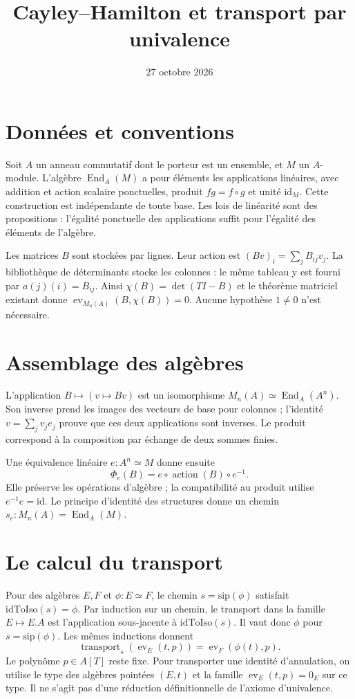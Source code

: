 \documentclass[11pt]{article}
\title{Cayley--Hamilton et transport par univalence}
\author{}
\date{27 octobre 2026}
\newcommand{\End}{\operatorname{End}}
\newcommand{\ev}{\operatorname{ev}}
\begin{document}
\maketitle

\section{Données et conventions}
Soit $A$ un anneau commutatif dont le porteur est un ensemble, et $M$
un $A$-module. L'algèbre $\End_A(M)$ a pour éléments les applications
linéaires, avec addition et action scalaire ponctuelles, produit
$fg=f\circ g$ et unité $\mathrm{id}_M$. Cette construction est indépendante
de toute base. Les lois de linéarité sont des propositions : l'égalité
ponctuelle des applications suffit pour l'égalité des éléments de l'algèbre.

Les matrices $B$ sont stockées par lignes. Leur action est
$(Bv)_i=\sum_j B_{ij}v_j$. La bibliothèque de déterminants stocke les
colonnes : le même tableau y est fourni par $a(j)(i)=B_{ij}$.
Ainsi $\chi(B)=\det(TI-B)$ et le théorème matriciel existant donne
$\ev_{M_n(A)}(B,\chi(B))=0$. Aucune hypothèse $1\ne0$ n'est nécessaire.

\section{Assemblage des algèbres}
L'application $B\mapsto(v\mapsto Bv)$ est un isomorphisme
$M_n(A)\simeq\End_A(A^n)$. Son inverse prend les images des vecteurs
de base pour colonnes ; l'identité $v=\sum_jv_je_j$ prouve que ces
deux applications sont inverses. Le produit correspond à la composition
par échange de deux sommes finies.

Une équivalence linéaire $e:A^n\simeq M$ donne ensuite
\[
 \Phi_e(B)=e\circ\operatorname{action}(B)\circ e^{-1}.
\]
Elle préserve les opérations d'algèbre ; la compatibilité au produit
utilise $e^{-1}e=\mathrm{id}$. Le principe d'identité des structures donne
un chemin $s_e:M_n(A)=\End_A(M)$.

\section{Le calcul du transport}
Pour des algèbres $E,F$ et $\phi:E\simeq F$, le chemin $s=\mathrm{sip}(\phi)$
satisfait $\mathrm{idToIso}(s)=\phi$. Par induction sur un chemin,
le transport dans la famille $E\mapsto E.A$ est l'application sous-jacente
à $\mathrm{idToIso}(s)$. Il vaut donc $\phi$ pour $s=\mathrm{sip}(\phi)$.
Les mêmes inductions donnent
\[
 \operatorname{transport}_s(\ev_E(t,p))=\ev_F(\phi(t),p).
\]
Le polynôme $p\in A[T]$ reste fixe. Pour transporter une identité
d'annulation, on utilise le type des algèbres pointées $(E,t)$ et la
famille $\ev_E(t,p)=0_E$ sur ce type. Il ne s'agit pas d'une réduction
définitionnelle de l'axiome d'univalence.
\end{document}
